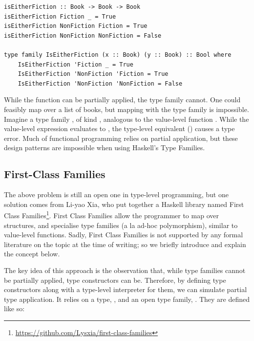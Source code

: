 \begin{lstlisting}
isEitherFiction :: Book -> Book -> Book
isEitherFiction Fiction _ = True
isEitherFiction NonFiction Fiction = True
isEitherFiction NonFiction NonFiction = False

type family IsEitherFiction (x :: Book) (y :: Book) :: Bool where
    IsEitherFiction 'Fiction _ = True
    IsEitherFiction 'NonFiction 'Fiction = True
    IsEitherFiction 'NonFiction 'NonFiction = False
\end{lstlisting}

While the function  can be partially applied, the type family  cannot. One could feasibly map  over a list of books, but mapping with the type family  is impossible. Imagine a type family , of kind , analogous to the value-level function . While the value-level expression  evaluates to , the type-level equivalent () causes a type error. Much of functional programming relies on partial application, but these design patterns are impossible when using Haskell's Type Families.

\subsection{First-Class Families} \label{fcfbackground}

The above problem is still an open one in type-level programming, but one solution comes from Li-yao Xia, who put together a Haskell library named First Class Families\footnote{\url{https://github.com/Lysxia/first-class-families}}. First Class Families allow the programmer to map over structures, and specialise type families (a la ad-hoc polymorphism), similar to value-level functions. Sadly, First Class Families is not supported by any formal literature on the topic at the time of writing; so we briefly introduce and explain the concept below.

The key idea of this approach is the observation that, while type families cannot be partially applied, type constructors can be. Therefore, by defining type constructors along with a type-level interpreter for them, we can simulate partial type application. It relies on a type, , and an open type family, . They are defined like so:

